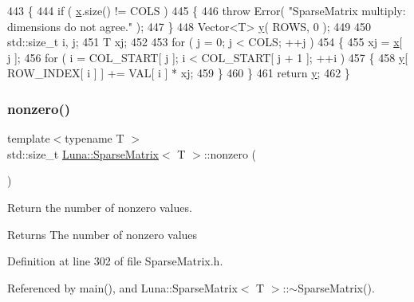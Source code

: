\begin{DoxyCode}
443   \{
444     \textcolor{keywordflow}{if} ( \hyperlink{namespaceHeat__plot_aa88370c16b85b784ccbde3ed88bc1991}{x}.size() != COLS )
445     \{
446       \textcolor{keywordflow}{throw} Error( \textcolor{stringliteral}{"SparseMatrix multiply: dimensions do not agree."} );
447     \}
448     Vector<T> \hyperlink{ODE__BVP__test_8cpp_adf764cbdea00d65edcd07bb9953ad2b7ae1f9fdb8b786c63efc4ce44eeacd17f2}{y}( ROWS, 0 );
449 
450     std::size\_t i, j;
451     T xj;
452 
453     \textcolor{keywordflow}{for} ( j = 0; j < COLS; ++j )
454     \{
455       xj = \hyperlink{namespaceHeat__plot_aa88370c16b85b784ccbde3ed88bc1991}{x}[ j ];
456       \textcolor{keywordflow}{for} ( i = COL\_START[ j ]; i < COL\_START[ j + 1 ]; ++i )
457       \{
458         \hyperlink{ODE__BVP__test_8cpp_adf764cbdea00d65edcd07bb9953ad2b7ae1f9fdb8b786c63efc4ce44eeacd17f2}{y}[ ROW\_INDEX[ i ] ] += VAL[ i ] * xj;
459       \}
460     \}
461     \textcolor{keywordflow}{return} \hyperlink{ODE__BVP__test_8cpp_adf764cbdea00d65edcd07bb9953ad2b7ae1f9fdb8b786c63efc4ce44eeacd17f2}{y};
462   \}
\end{DoxyCode}
\mbox{\label{classLuna_1_1SparseMatrix_a84c317800c26bc9548c66db99af09b56}} 
\subsubsection{\texorpdfstring{nonzero()}{nonzero()}}
{\footnotesize\ttfamily template$<$typename T $>$ \\
std\+::size\+\_\+t \hyperlink{classLuna_1_1SparseMatrix}{Luna\+::\+Sparse\+Matrix}$<$ T $>$\+::nonzero (\begin{DoxyParamCaption}{ }\end{DoxyParamCaption})\hspace{0.3cm}{\ttfamily [inline]}}



Return the number of nonzero values. 

\begin{DoxyReturn}{Returns}
The number of nonzero values 
\end{DoxyReturn}


Definition at line 302 of file Sparse\+Matrix.\+h.



Referenced by main(), and Luna\+::\+Sparse\+Matrix$<$ T $>$\+::$\sim$\+Sparse\+Matrix().


